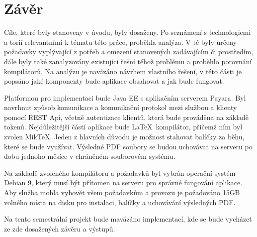 \chapter{Závěr}

Cíle, které byly stanoveny v úvodu, byly dosaženy. Po seznámení s technologiemi a torií relevantními k tématu této práce, proběhla analýza. V té byly určeny požadavky vyplývající z potřeb a omezení stanovených zadávajícím či prostředím, dále byly také zanalyzovány existující řešní téhož problému a proběhlo porovnání kompilátorů. Na analýzu je navázáno návrhem vlastního řešení, v této části je popsáno jaké komponenty bude aplikace obsahovat a jak bude fungovat. 
\par
Platformou pro implementaci bude Java EE s aplikačním serverem Payara. Byl navrhnut způsob komunikace a komunikační protokol mezi službou a klienty pomocí REST Api, včetně autentizace klientů, která bude prováděna na základě tokenů. Nejdůležitější částí aplikace bude \LaTeX\ kompilátor, přičemž ním byl zvolen MikTeX. Jeden z hlavních důvodu je možnost stahovat balíčky za běhu, které se bude využívat. Výsledné PDF soubory se budou uchovávat na serveru po dobu jednoho měsíce v chráněném souborovém systému. 
\par
Na základě zvoleného kompilátoru a požadavků byl vybrán operační systém Debian 9, který musí být přítomen na serveru pro správné fungování aplikace. Aby služba mohla vyhovět všem požadavkům a provozu je požadováno 15GB volného místa na disku pro instalaci, balíčky a uchovávání výsledných PDF.
\par
Na tento semestrální projekt bude mavázáno implementací, kde se bude vycházet ze zde dosažených závěru a výstupů.
 